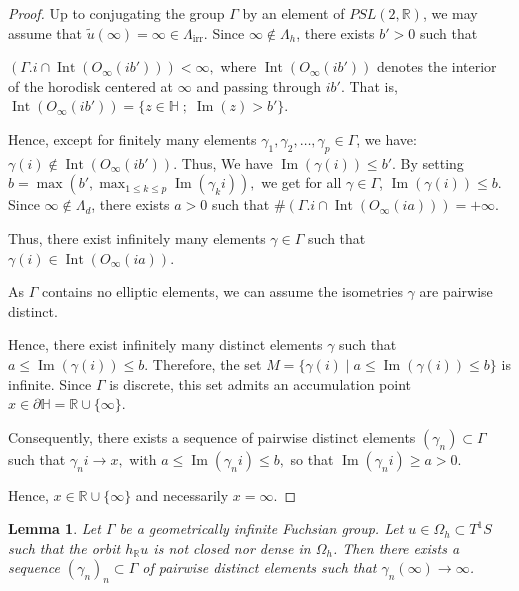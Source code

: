 \documentclass[11pt]{amsart}
\newtheorem{lem}{Lemma}[section]
\begin{document}
\begin{proof}
Up to conjugating the group \( \Gamma \) by an element of \( PSL(2, \mathbb{R}) \), we may assume that \( \widetilde{u}(\infty) = \infty \in \Lambda_{\mathrm{irr}} \). Since \( \infty \notin \Lambda_h \), there exists \( b' > 0 \) such that

$\left( \Gamma.i \cap \operatorname{Int}(O_{\infty}(ib')) \right) < \infty,$
where \( \operatorname{Int}(O_{\infty}(ib')) \) denotes the interior of the horodisk centered at \( \infty \) and passing through \( ib' \).  
That is, \( \operatorname{Int}(O_{\infty}(ib')) = \{ z \in \mathbb{H} \; ; \; \operatorname{Im}(z) > b' \} \).

Hence, except for finitely many elements \( \gamma_1, \gamma_2, \ldots, \gamma_p \in \Gamma \), we have:
$
\gamma(i) \notin \operatorname{Int}(O_{\infty}(ib')).
$
Thus, We have $\operatorname{Im}(\gamma(i)) \leq b' $. By setting 
$
b = \max \left( b', \max_{1 \leq k \leq p} \operatorname{Im}(\gamma_k i) \right),
$
we get for all \( \gamma \in \Gamma \),
$
\operatorname{Im}(\gamma(i)) \leq b.
$
Since \( \infty \notin \Lambda_d \), there exists \( a > 0 \) such that 
$
\# \left( \Gamma.i \cap \operatorname{Int}(O_{\infty}(i a)) \right) = +\infty.
$

Thus, there exist infinitely many elements \( \gamma \in \Gamma \) such that
$
\gamma(i) \in \operatorname{Int}(O_{\infty}(i a)).
$

As \( \Gamma \) contains no elliptic elements, we can assume the isometries \( \gamma \) are pairwise distinct.

Hence, there exist infinitely many distinct elements \( \gamma \) such that
$
a \leq \operatorname{Im}(\gamma(i)) \leq b.
$
Therefore, the set 
$
M = \{ \gamma(i) \mid a \leq \operatorname{Im}(\gamma(i)) \leq b \}
$
is infinite. Since \( \Gamma \) is discrete, this set admits an accumulation point
$
x \in \partial \mathbb{H} = \mathbb{R} \cup \{\infty\}.
$

Consequently, there exists a sequence of pairwise distinct elements \( (\gamma_n) \subset \Gamma \) such that
$
\gamma_n i \to x,
$
with
$
a \leq \operatorname{Im}(\gamma_n i) \leq b,
$
so that
$
\operatorname{Im}(\gamma_n i) \geq a > 0.
$

Hence, \( x \in \mathbb{R} \cup \{\infty\} \) and necessarily
$
x = \infty.
$
\end{proof}
\begin{lem}\label{H}
Let \(\Gamma\) be a geometrically infinite Fuchsian group.  
Let \(u \in \Omega_{h} \subset T^{1}S\) such that the orbit \(h_{\mathbb{R}} u\) is not closed nor dense in $\Omega_{h}$.  
Then there exists a sequence \((\gamma_n)_{n} \subset \Gamma\) of pairwise distinct elements such that \(\gamma_n(\infty) \to \infty\).
\end{lem}
\end{document}
